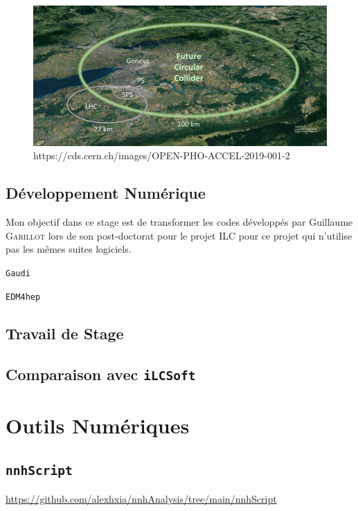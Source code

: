 \documentclass[10pt,a4paper]{report}
\begin{document}
\begin{figure}[h!]
    \centering
    \includegraphics[width=\textwidth]{../img/FCC.jpg}
    \caption{https://cds.cern.ch/images/OPEN-PHO-ACCEL-2019-001-2}
    \label{fcc:img}
\end{figure}

\section{Développement Numérique}

Mon objectif dans ce stage est de transformer les codes développés par Guillaume 
\textsc{Garillot} lors de son post-doctorat pour le projet ILC pour ce projet 
qui n'utilise pas les mêmes suites logiciels.

\texttt{Gaudi}

\texttt{EDM4hep}

\section{Travail de Stage}

\section{Comparaison avec \texttt{iLCSoft}}


\chapter{Outils Numériques}

\section{\texttt{nnhScript}}
\url{https://github.com/alexhxia/nnhAnalysis/tree/main/nnhScript}
\end{document}

